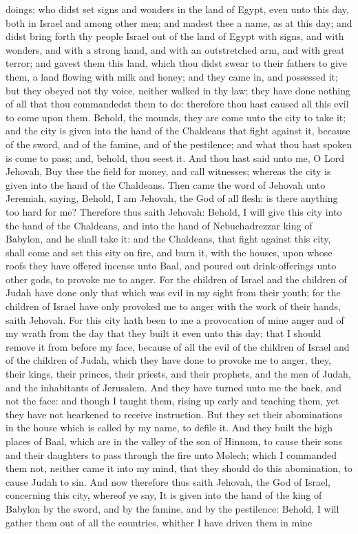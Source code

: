 doings; who didst set signs and wonders in the land of Egypt, even unto this day, both in Israel and among other men; and madest thee a name, as at this day; and didst bring forth thy people Israel out of the land of Egypt with signs, and with wonders, and with a strong hand, and with an outstretched arm, and with great terror; and gavest them this land, which thou didst swear to their fathers to give them, a land flowing with milk and honey; and they came in, and possessed it; but they obeyed not thy voice, neither walked in thy law; they have done nothing of all that thou commandedst them to do: therefore thou hast caused all this evil to come upon them. Behold, the mounds, they are come unto the city to take it; and the city is given into the hand of the Chaldeans that fight against it, because of the sword, and of the famine, and of the pestilence; and what thou hast spoken is come to pass; and, behold, thou seest it. And thou hast said unto me, O Lord Jehovah, Buy thee the field for money, and call witnesses; whereas the city is given into the hand of the Chaldeans.  Then came the word of Jehovah unto Jeremiah, saying, Behold, I am Jehovah, the God of all flesh: is there anything too hard for me? Therefore thus saith Jehovah: Behold, I will give this city into the hand of the Chaldeans, and into the hand of Nebuchadrezzar king of Babylon, and he shall take it: and the Chaldeans, that fight against this city, shall come and set this city on fire, and burn it, with the houses, upon whose roofs they have offered incense unto Baal, and poured out drink-offerings unto other gods, to provoke me to anger. For the children of Israel and the children of Judah have done only that which was evil in my sight from their youth; for the children of Israel have only provoked me to anger with the work of their hands, saith Jehovah. For this city hath been to me a provocation of mine anger and of my wrath from the day that they built it even unto this day; that I should remove it from before my face, because of all the evil of the children of Israel and of the children of Judah, which they have done to provoke me to anger, they, their kings, their princes, their priests, and their prophets, and the men of Judah, and the inhabitants of Jerusalem. And they have turned unto me the back, and not the face: and though I taught them, rising up early and teaching them, yet they have not hearkened to receive instruction. But they set their abominations in the house which is called by my name, to defile it. And they built the high places of Baal, which are in the valley of the son of Hinnom, to cause their sons and their daughters to pass through the fire unto Molech; which I commanded them not, neither came it into my mind, that they should do this abomination, to cause Judah to sin.  And now therefore thus saith Jehovah, the God of Israel, concerning this city, whereof ye say, It is given into the hand of the king of Babylon by the sword, and by the famine, and by the pestilence: Behold, I will gather them out of all the countries, whither I have driven them in mine 